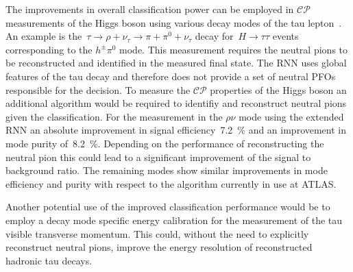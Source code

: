 The improvements in overall classification power can be employed in
$\mathcal{CP}$ measurements of the Higgs boson using various decay modes of the
tau lepton~\cite{Berge2014}. An example is
the~$\tau \to \rho + \nu_\tau \to \pi + \pi^0 + \nu_\tau$ decay
for~$H \to \tau\tau$ events corresponding to the $h^\pm \pi^0$ mode. This
measurement requires the neutral pions to be reconstructed and identified in the
measured final state. The RNN uses global features of the tau decay and
therefore does not provide a set of neutral PFOs responsible for the decision.
To measure the $\mathcal{CP}$ properties of the Higgs boson an additional
algorithm would be required to identifiy and reconstruct neutral pions given the
classification. For the measurement in the $\rho\nu$ mode using the extended RNN
an absolute improvement in signal efficiency~\SI{7.2}{\percent} and an
improvement in mode purity of~\SI{8.2}{\percent}. Depending on the performance
of reconstructing the neutral pion this could lead to a significant improvement
of the signal to background ratio. The remaining modes show similar improvements
in mode efficiency and purity with respect to the algorithm currently in use at
ATLAS.

Another potential use of the improved classification performance would be to
employ a decay mode specific energy calibration for the measurement of the tau
visible transverse momentum. This could, without the need to explicitly
reconstruct neutral pions, improve the energy resolution of reconstructed
hadronic tau decays.


